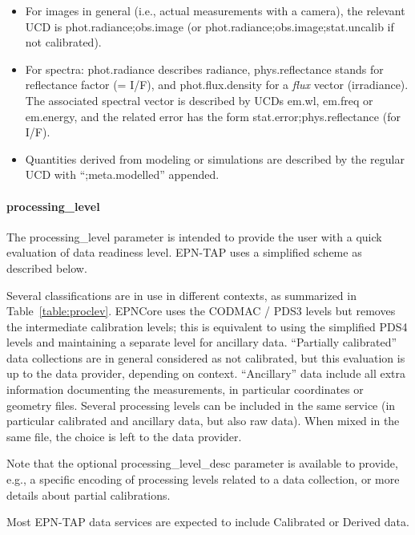 \documentclass[11pt,a4paper]{ivoa}
\begin{document}
\begin{itemize}
\item For images in general (i.e., actual measurements with a camera),
the relevant UCD is phot.radiance;obs.image (or phot.radiance;obs.image;stat.uncalib if not
calibrated).

\item For spectra: phot.radiance describes radiance, phys.reflectance
stands for reflectance factor (= I/F), and phot.flux.density for a
\emph{flux} vector (irradiance). The associated spectral vector is
described by UCDs em.wl, em.freq or em.energy, and the related error
has the form stat.error;phys.reflectance (for I/F).

\item Quantities derived from modeling or simulations are described by the
regular UCD with ``;meta.modelled'' appended.
\end{itemize}

\paragraph{processing\_level}

The processing\_level parameter is intended to provide the user with
a quick evaluation of data readiness level. EPN-TAP uses
a simplified scheme as described below.

Several classifications are in use in different contexts, as summarized
in Table~\ref{table:proclev}.  EPNCore uses the CODMAC / PDS3 levels but removes
the intermediate calibration levels; this is equivalent to using the
simplified PDS4 levels and maintaining a separate level for ancillary
data. ``Partially calibrated'' data collections are in general considered as not
calibrated, but this evaluation is up to the data provider, depending on
context. ``Ancillary'' data include all extra information documenting
the measurements, in particular coordinates or geometry files. Several
processing levels can be included in the same service (in particular
calibrated and ancillary data, but also raw data). When mixed in the
same file, the choice is left to the data provider.

Note that the optional processing\_level\_desc parameter
is available to provide, e.g., a specific encoding of processing
levels related to a data collection, or more details about partial calibrations.

Most EPN-TAP data services are expected to include Calibrated or
Derived data.
\end{document}
